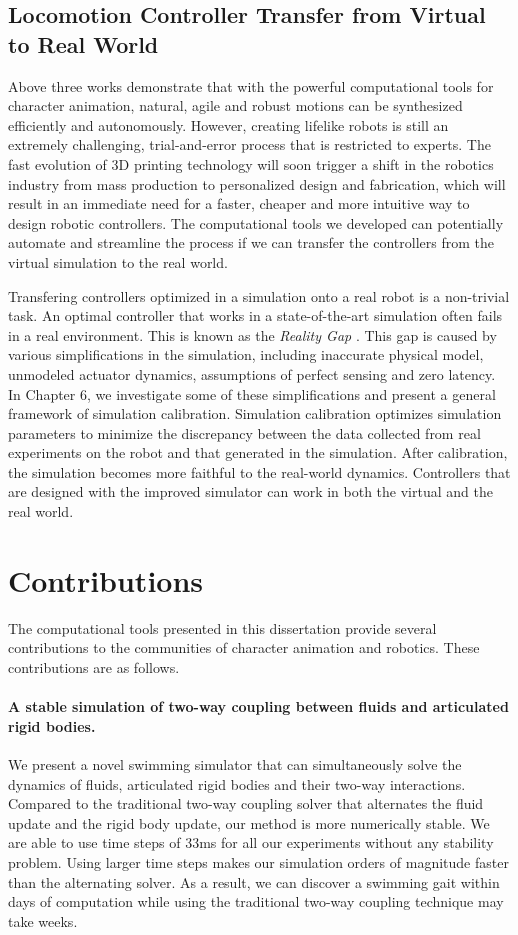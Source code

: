 \subsection{Locomotion Controller Transfer from Virtual to Real World}

Above three works demonstrate that with the powerful computational tools for character animation, natural, agile and robust motions can be synthesized efficiently and autonomously. However, creating lifelike robots is still an extremely challenging, trial-and-error process that is restricted to experts. The fast evolution of 3D printing technology will soon trigger a shift in the robotics industry from mass production to personalized design and fabrication, which will result in an immediate need for a faster, cheaper and more intuitive way to design robotic controllers. The computational tools we developed can potentially automate and streamline the process if we can transfer the controllers from the virtual simulation to the real world.

Transfering controllers optimized in a simulation onto a real robot is a non-trivial task. An optimal controller that works in a state-of-the-art simulation often fails in a real environment. This is known as the \emph{Reality Gap} \cite{}. This gap is caused by various simplifications in the simulation, including inaccurate physical model, unmodeled actuator dynamics, assumptions of perfect sensing and zero latency. In Chapter 6, we investigate some of these simplifications and present a general framework of simulation calibration. Simulation calibration optimizes simulation parameters to minimize the discrepancy between the data collected from real experiments on the robot and that generated in the simulation. After calibration, the simulation becomes more faithful to the real-world dynamics. Controllers that are designed with the improved simulator can work in both the virtual and the real world. 

\section{Contributions}

The computational tools presented in this dissertation provide several contributions to the communities of character animation and robotics. These contributions are as follows.

\paragraph{A stable simulation of two-way coupling between fluids and articulated rigid bodies.} We present a novel swimming simulator that can simultaneously solve the dynamics of fluids, articulated rigid bodies and their two-way interactions. Compared to the traditional two-way coupling solver that alternates the fluid update and the rigid body update, our method is more numerically stable. We are able to use time steps of 33ms for all our experiments without any stability problem. Using larger time steps makes our simulation orders of magnitude faster than the alternating solver. As a result, we can discover a swimming gait within days of computation while using the traditional two-way coupling technique may take weeks.

